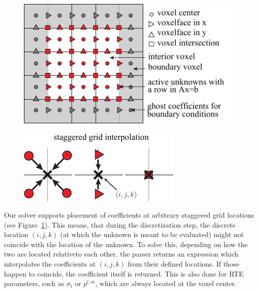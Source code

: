 \begin{figure}[h]

\centering
\includegraphics[width=0.9\columnwidth]{figures/fig_staggered_grids.pdf}
\label{fig:staggeredgrid}
\end{figure}

\begin{figure}
\hspace{-.1in}
\includegraphics[width=0.6\columnwidth]{figures/fig_staggered_interpolation.pdf}
\vspace{-.1in}
\end{figure}Our solver supports placement of coefficients at arbitrary staggered grid locations (see Figure~\ref{fig:staggeredgrid}). This means, that during the discretization step, the discrete location $(i, j, k)$ (at which the unknown is meant to be evaluated) might not coincide with the location of the unknown. To solve this, depending on how the two are located relativeto each other, the parser returns an expression which interpolates the coefficients at $(i, j, k)$ from their defined locations. If those happen to coincide, the coefficient itself is returned. This is also done for RTE parameters, such as $\sigma_t$ or $p^{l,m}$, which are always located at the voxel center.



